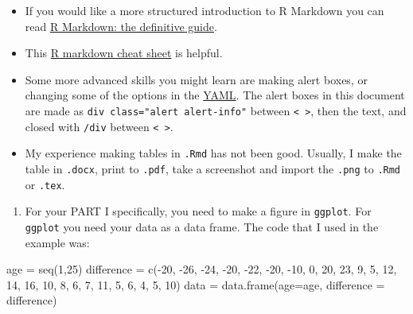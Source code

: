 \documentclass[
]{book}
\newenvironment{Shaded}{\begin{snugshade}}{\end{snugshade}}
\newcommand{\AttributeTok}[1]{\textcolor[rgb]{0.77,0.63,0.00}{#1}}
\newcommand{\DecValTok}[1]{\textcolor[rgb]{0.00,0.00,0.81}{#1}}
\newcommand{\FunctionTok}[1]{\textcolor[rgb]{0.00,0.00,0.00}{#1}}
\newcommand{\NormalTok}[1]{#1}
\newcommand{\OtherTok}[1]{\textcolor[rgb]{0.56,0.35,0.01}{#1}}
\newcommand{\SpecialCharTok}[1]{\textcolor[rgb]{0.00,0.00,0.00}{#1}}
\providecommand{\tightlist}{%
  \setlength{\itemsep}{0pt}\setlength{\parskip}{0pt}}
\begin{document}
\begin{itemize}
\item
  If you would like a more structured introduction to R Markdown you can read \href{https://bookdown.org/yihui/rmarkdown/}{R Markdown: the definitive guide}.
\item
  This \href{https://www.rstudio.com/wp-content/uploads/2015/02/rmarkdown-cheatsheet.pdf}{R markdown cheat sheet} is helpful.
\item
  Some more advanced skills you might learn are making alert boxes, or changing some of the options in the \href{https://bookdown.org/yihui/rmarkdown/html-document.html}{YAML}. The alert boxes in this document are made as \texttt{div\ class="alert\ alert-info"} between \texttt{\textless{}\ \textgreater{}}, then the text, and closed with \texttt{/div} between \texttt{\textless{}\ \textgreater{}}.
\item
  My experience making tables in \texttt{.Rmd} has not been good. Usually, I make the table in \texttt{.docx}, print to \texttt{.pdf}, take a screenshot and import the \texttt{.png} to \texttt{.Rmd} or \texttt{.tex}.
\end{itemize}

\begin{enumerate}
\def\labelenumi{\arabic{enumi}.}
\setcounter{enumi}{4}
\tightlist
\item
  For your PART I specifically, you need to make a figure in \texttt{ggplot}. For \texttt{ggplot} you need your data as a data frame. The code that I used in the example was:
\end{enumerate}

\begin{Shaded}
\begin{Highlighting}[]
\NormalTok{age }\OtherTok{=} \FunctionTok{seq}\NormalTok{(}\DecValTok{1}\NormalTok{,}\DecValTok{25}\NormalTok{)}
\NormalTok{difference }\OtherTok{=} \FunctionTok{c}\NormalTok{(}\SpecialCharTok{{-}}\DecValTok{20}\NormalTok{, }\SpecialCharTok{{-}}\DecValTok{26}\NormalTok{, }\SpecialCharTok{{-}}\DecValTok{24}\NormalTok{, }\SpecialCharTok{{-}}\DecValTok{20}\NormalTok{, }\SpecialCharTok{{-}}\DecValTok{22}\NormalTok{, }\SpecialCharTok{{-}}\DecValTok{20}\NormalTok{, }\SpecialCharTok{{-}}\DecValTok{10}\NormalTok{, }\DecValTok{0}\NormalTok{,}
               \DecValTok{20}\NormalTok{, }\DecValTok{23}\NormalTok{, }\DecValTok{9}\NormalTok{, }\DecValTok{5}\NormalTok{, }\DecValTok{12}\NormalTok{, }\DecValTok{14}\NormalTok{, }\DecValTok{16}\NormalTok{, }\DecValTok{10}\NormalTok{, }\DecValTok{8}\NormalTok{, }\DecValTok{6}\NormalTok{, }\DecValTok{7}\NormalTok{, }\DecValTok{11}\NormalTok{, }\DecValTok{5}\NormalTok{, }\DecValTok{6}\NormalTok{, }\DecValTok{4}\NormalTok{, }\DecValTok{5}\NormalTok{, }\DecValTok{10}\NormalTok{)}
\NormalTok{data }\OtherTok{=} \FunctionTok{data.frame}\NormalTok{(}\AttributeTok{age=}\NormalTok{age, }\AttributeTok{difference =}\NormalTok{ difference)}
\end{Highlighting}
\end{Shaded}
\end{document}
